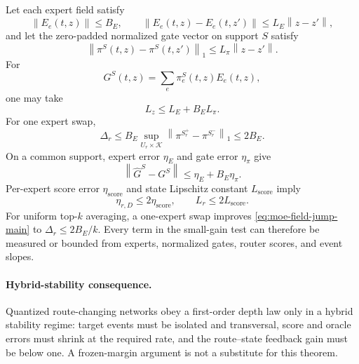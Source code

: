 \documentclass[twoside,11pt]{article}
\newcommand{\norm}[1]{\left\lVert #1\right\rVert}
\begin{document}
Let each expert field satisfy
\begin{equation}
 \norm{E_e(t,z)}\le B_E,
 \qquad
 \norm{E_e(t,z)-E_e(t,z')}\le L_E\norm{z-z'},
 \label{eq:moe-expert-bounds-main}
\end{equation}
and let the zero-padded normalized gate vector on support $S$ satisfy
\begin{equation}
 \norm{\pi^S(t,z)-\pi^S(t,z')}_1
 \le L_\pi\norm{z-z'}.
 \label{eq:moe-gate-lipschitz-main}
\end{equation}
For
\begin{equation}
 G^S(t,z)=\sum_e\pi_e^S(t,z)E_e(t,z),
 \label{eq:weighted-moe-field-main}
\end{equation}
one may take
\begin{equation}
 L_z\le L_E+B_EL_\pi.
 \label{eq:moe-field-lipschitz-main}
\end{equation}
For one expert swap,
\begin{equation}
 \Delta_r
 \le B_E\sup_{U_r\times\mathcal K}
       \norm{\pi^{S_r^+}-\pi^{S_r^-}}_1
 \le2B_E.
 \label{eq:moe-field-jump-main}
\end{equation}
On a common support, expert error $\eta_E$ and gate error $\eta_\pi$ give
\begin{equation}
 \norm{\widehat G^S-G^S}\le\eta_E+B_E\eta_\pi.
 \label{eq:moe-field-error-main}
\end{equation}
Per-expert score error $\eta_{\mathrm{score}}$ and state Lipschitz constant $L_{\mathrm{score}}$ imply
\begin{equation}
 \eta_{r,D}\le2\eta_{\mathrm{score}},
 \qquad
 L_r\le2L_{\mathrm{score}}.
 \label{eq:moe-gap-constants-main}
\end{equation}
For uniform top-$k$ averaging, a one-expert swap improves \eqref{eq:moe-field-jump-main} to $\Delta_r\le2B_E/k$.  Every term in the small-gain test can therefore be measured or bounded from experts, normalized gates, router scores, and event slopes.

\paragraph{Hybrid-stability consequence.}
Quantized route-changing networks obey a first-order depth law only in a hybrid stability regime: target events must be isolated and transversal, score and oracle errors must shrink at the required rate, and the route--state feedback gain must be below one.  A frozen-margin argument is not a substitute for this theorem.
\end{document}
